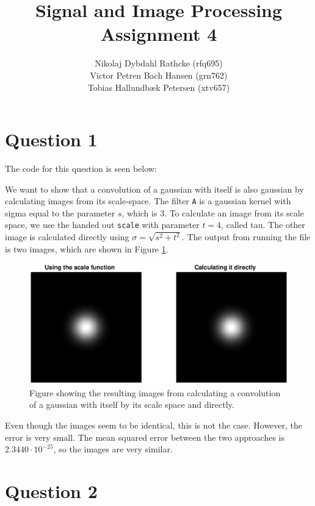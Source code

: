 \documentclass[a4paper]{article}
\author{Nikolaj Dybdahl Rathcke (rfq695) \\
        Victor Petren Bach Hansen (grn762) \\
        Tobias Hallundbæk Petersen (xtv657) }
\title{Signal and Image Processing \\ Assignment 4}
\begin{document}
\maketitle
\section*{Question 1}
The code for this question is seen below:

We want to show that a convolution of a gaussian with itself is also gaussian by calculating images from its scale-space. The filter \texttt{A} is a gaussian kernel with sigma equal to the parameter $s$, which is $3$. To calculate an image from its scale space, we use the handed out \texttt{scale} with parameter $t=4$, called tau. The other image is calculated directly using $\sigma=\sqrt{s^2+t^2}$. The output from running the file is two images, which are shown in Figure \ref{q1_1}.
\begin{figure}[H]
  \centering
  \captionsetup{justification=centering}
\includegraphics[width=\textwidth]{q1_1.eps}
  \caption{Figure showing the resulting images from calculating a convolution of a gaussian with itself by its scale space and directly.}
  \label{q1_1}
\end{figure}
Even though the images seem to be identical, this is not the case. However, the error is very small. The mean squared error between the two approaches is $2.3440\cdot10^{-25}$, so the images are very similar.

\section*{Question 2}
\end{document}
